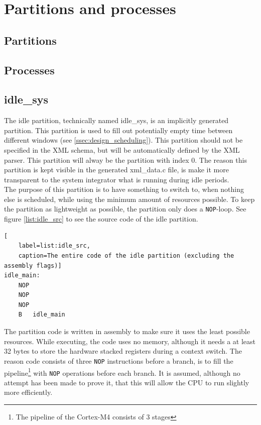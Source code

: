 \section{Partitions and processes}

\subsection{Partitions}

\subsection{Processes}

\subsection{idle\_sys}
\label{ssec:idle_part}
The idle partition, technically named idle\_sys, is an implicitly generated
partition. This partition is used to fill out potentially empty time between
different windows (see \ref{ssec:design_scheduling}). This partition should not
be specified in the XML schema, but will be automatically defined by the XML
parser. This partition will alway be the partition with index 0. The reason this
partition is kept visible in the generated xml\_data.c file, is make it more
transparent to the system integrator what is running during idle periods.\\

The purpose of this partition is to have something to switch to, when nothing
else is scheduled, while using the minimum amount of resources possible.
To keep the partition as lightweight as possible, the partition only does a
\texttt{NOP}-loop. See figure \ref{list:idle_src} to see the source code of the
idle partition.\\
\begin {lstlisting}[
	label=list:idle_src,
	caption=The entire code of the idle partition (excluding the assembly flags)]
idle_main:
	NOP
	NOP
	NOP
	B   idle_main
\end{lstlisting}

The partition code is written in assembly to make sure it uses the least possible
resources. While executing, the code uses no memory, although it needs a at
least 32 bytes to store the hardware stacked registers during a context switch.
The reason code consists of three \texttt{NOP} instructions before a branch, is
to fill the pipeline\footnote{The pipeline of the Cortex-M4 consists of 3 stages}
with \texttt{NOP} operations before each branch. It is assumed, although no
attempt has been made to prove it, that this will allow the CPU to run slightly
more efficiently.

